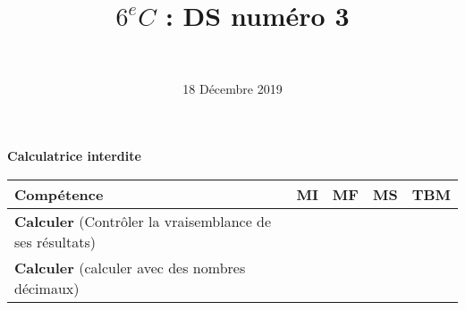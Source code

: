 \documentclass[a4paper,11pt]{exam}
\author{\ }
\date{18 Décembre 2019}
\title{$6^e C$ : DS num\'ero 3}
\begin{document}
%	

	\maketitle
	
\begin{center}
	\textbf{Calculatrice interdite}
\end{center}

\begin{small}
	\begin{center}
		\begin{tabular}{|@{\ }l@{\ }|@{\ }c@{\ }|@{\ }c@{\ }|@{\ }c@{\ }|@{\ }c@{\ }|}
			\hline
			\textbf{Compétence} & \textbf{MI} & \textbf{MF} & \textbf{MS} & \textbf{TBM} \\
			\hline
			\textbf{Calculer} (Contrôler la vraisemblance de ses résultats) &  \ \ & \ \ & \ \ & \ \  \\
			\hline
			\textbf{Calculer} (calculer avec des nombres décimaux)&  \ \ & \ \ & \ \ & \ \  \\
			\hline	
%			 
		\end{tabular}
	\end{center}
\end{small}	

	
	
	

%












\label{LastPage}

%
\end{document}
